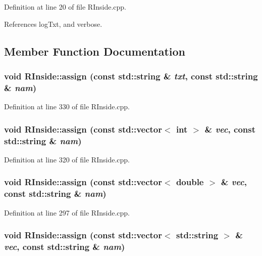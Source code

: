 Definition at line 20 of file RInside.cpp.

References logTxt, and verbose.

\subsection{Member Function Documentation}
\hypertarget{classRInside_a7073300c48c03478361b881e2d307ad6}{
\subsubsection[{assign}]{\setlength{\rightskip}{0pt plus 5cm}void RInside::assign (const std::string \& {\em txt}, \/  const std::string \& {\em nam})}}
\label{classRInside_a7073300c48c03478361b881e2d307ad6}


Definition at line 330 of file RInside.cpp.\hypertarget{classRInside_ab13e05865dec061ba1def1d922d2a58c}{
\subsubsection[{assign}]{\setlength{\rightskip}{0pt plus 5cm}void RInside::assign (const std::vector$<$ int $>$ \& {\em vec}, \/  const std::string \& {\em nam})}}
\label{classRInside_ab13e05865dec061ba1def1d922d2a58c}


Definition at line 320 of file RInside.cpp.\hypertarget{classRInside_a9086ea21bd4a47d9411c6451c1ae50f5}{
\subsubsection[{assign}]{\setlength{\rightskip}{0pt plus 5cm}void RInside::assign (const std::vector$<$ double $>$ \& {\em vec}, \/  const std::string \& {\em nam})}}
\label{classRInside_a9086ea21bd4a47d9411c6451c1ae50f5}


Definition at line 297 of file RInside.cpp.\hypertarget{classRInside_a7c5cb94cc703541037e6acf243dc2b1b}{
\subsubsection[{assign}]{\setlength{\rightskip}{0pt plus 5cm}void RInside::assign (const std::vector$<$ std::string $>$ \& {\em vec}, \/  const std::string \& {\em nam})}}
\label{classRInside_a7c5cb94cc703541037e6acf243dc2b1b}


